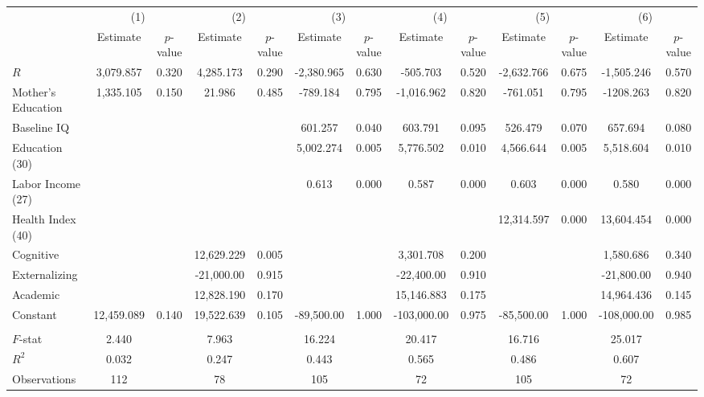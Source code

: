 \begin{tabular}{lcccccccccccc} \toprule
 & \multicolumn{2}{c}{(1)}  &  \multicolumn{2}{c}{(2)}  &  \multicolumn{2}{c}{(3)}  &  \multicolumn{2}{c}{(4)}  & \multicolumn{2}{c}{(5)} & \multicolumn{2}{c}{(6)} \\  
 & Estimate & $p$-value & Estimate & $p$-value & Estimate & $p$-value & Estimate & $p$-value & Estimate & $p$-value & Estimate & $p$-value \\ \midrule
$R$ &  3,079.857 &     0.320 &  4,285.173 &     0.290 & -2,380.965 &     0.630 &  -505.703 &     0.520 & -2,632.766 &     0.675 & -1,505.246 &     0.570 \\  
Mother's Education &  1,335.105 &     0.150 &    21.986 &     0.485 &  -789.184 &     0.795 & -1,016.962 &     0.820 &  -761.051 &     0.795 & -1208.263 &     0.820 \\  
Baseline IQ &         &         &         &         &   601.257 &     0.040 &   603.791 &     0.095 &   526.479 &     0.070 &   657.694 &     0.080 \\  
Education (30) &         &         &         &         &  5,002.274 &     0.005 &  5,776.502 &     0.010 &  4,566.644 &     0.005 &  5,518.604 &     0.010 \\  
Labor Income (27) &         &         &         &         &     0.613 &     0.000 &     0.587 &     0.000 &     0.603 &     0.000 &     0.580 &     0.000 \\  
Health Index (40) &         &         &         &         &         &         &         &         & 12,314.597 &     0.000 & 13,604.454 &     0.000 \\  
Cognitive &         &         & 12,629.229 &     0.005 &         &         &  3,301.708 &     0.200 &         &         &  1,580.686 &     0.340 \\  
Externalizing &         &         & -21,000.00 &     0.915 &         &         & -22,400.00  &     0.910 &         &         & -21,800.00 &     0.940 \\  
Academic  &         &         & 12,828.190 &     0.170 &         &         & 15,146.883 &     0.175 &         &         & 14,964.436 &     0.145 \\  
Constant  & 12,459.089 &     0.140 & 19,522.639 &     0.105 & -89,500.00 &     1.000 & -103,000.00 &     0.975 & -85,500.00 &     1.000 & -108,000.00 &     0.985 \\  \\ \midrule
$F$-stat &     2.440 &      &     7.963 &      &    16.224 &      &    20.417 &     &    16.716 &     &    25.017 &     \\  
$R^2$ &     0.032 &      &     0.247 &     &     0.443 &      &     0.565 &      &     0.486 &    &     0.607 &     \\  
Observations &   112 &     &    78 &      &   105 &     &    72 &     &   105 &     &    72 &     \\  
\bottomrule \end{tabular}
